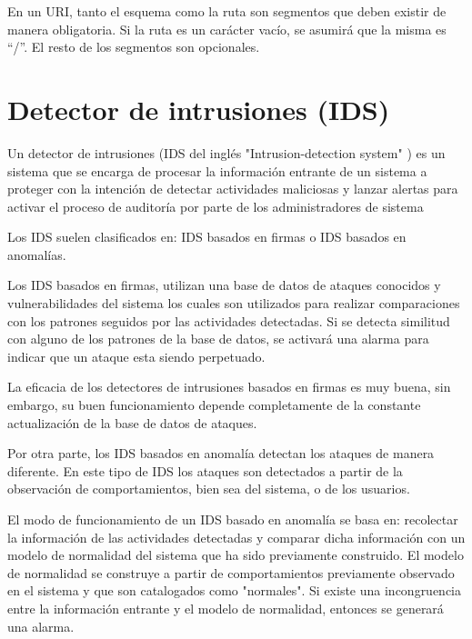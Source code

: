 En un URI, tanto el esquema como la ruta son segmentos que deben existir de manera obligatoria. Si la ruta es un carácter vac\'io, se asumir\'a que la misma es ``/''. El resto de los segmentos son opcionales.

\section{Detector de intrusiones (IDS)}
Un detector de intrusiones (IDS del inglés "Intrusion-detection system" ) es un sistema que se encarga de procesar la información entrante de un sistema a proteger con la intención de detectar actividades maliciosas y lanzar alertas para activar el proceso de auditoría por parte de los administradores de sistema \cite{IDS}

Los IDS suelen clasificados en: IDS basados en firmas o 		IDS 	basados en anomalías. 

Los IDS basados en firmas, utilizan una base de datos de ataques conocidos y vulnerabilidades del sistema los cuales son utilizados para realizar comparaciones con los patrones seguidos por las actividades detectadas. Si se detecta similitud con alguno de los patrones de la base de datos, se activará una alarma para indicar que un ataque esta siendo perpetuado.

La eficacia de los detectores de intrusiones basados en firmas es muy buena, sin embargo, su buen funcionamiento depende completamente de la constante actualización de la base de datos de ataques.

Por otra parte, los IDS basados en anomalía detectan los ataques de manera diferente. En este tipo de IDS los ataques son detectados a partir de la observación de comportamientos, bien sea del sistema, o de los usuarios. 

El modo de funcionamiento de un IDS basado en anomalía se basa en: recolectar la información de las actividades detectadas y comparar dicha información con un modelo de normalidad del sistema que ha sido previamente construido. El modelo de normalidad se construye a partir de comportamientos previamente observado en el sistema y que son catalogados como "normales". Si existe una incongruencia entre la información entrante y el modelo de normalidad, entonces se generará una alarma.

